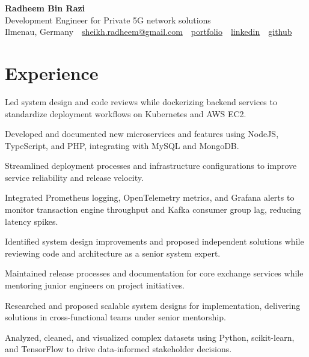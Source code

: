 \documentclass[10pt,a4paper]{resume}
\makeatletter
\newcommand{\Portfolio}{https://radheem.github.io/my-cv}
\newcommand{\PortfolioText}{portfolio}
\newcommand{\GitHub}{https://github.com/radheem}
\newcommand{\LinkedIn}{https://www.linkedin.com/in/radheem-razi}
\newcommand{\Email}{sheikh.radheem@gmail.com}
\makeatother
\begin{document}
\begin{center}
  {\huge\bfseries Radheem Bin Razi}\\[3pt]
  {\large Development Engineer for Private 5G network solutions}\\[6pt]
  \small
  Ilmenau, Germany \,\textbar\,
  \href{mailto:\Email}{\Email} \,\textbar\,
  \href{\Portfolio}{\PortfolioText} \,\textbar\,
  \href{\LinkedIn}{linkedin} \,\textbar\,
  \href{\GitHub}{github}
\end{center}
\vspace{2pt}

\section{Experience}

\bullets
  \item Led system design and code reviews while dockerizing backend services to standardize deployment workflows on Kubernetes and AWS EC2.
  \item Developed and documented new microservices and features using NodeJS, TypeScript, and PHP, integrating with MySQL and MongoDB.
  \item Streamlined deployment processes and infrastructure configurations to improve service reliability and release velocity.
\bulletsend
\vspace{1.5pt}
\bullets
  \item Integrated Prometheus logging, OpenTelemetry metrics, and Grafana alerts to monitor transaction engine throughput and Kafka consumer group lag, reducing latency spikes.
  \item Identified system design improvements and proposed independent solutions while reviewing code and architecture as a senior system expert.
  \item Maintained release processes and documentation for core exchange services while mentoring junior engineers on project initiatives.
\bulletsend
\vspace{1.5pt}
\bullets
  \item Researched and proposed scalable system designs for implementation, delivering solutions in cross-functional teams under senior mentorship.
  \item Analyzed, cleaned, and visualized complex datasets using Python, scikit-learn, and TensorFlow to drive data-informed stakeholder decisions.
\bulletsend
\vspace{1.5pt}
\end{document}
